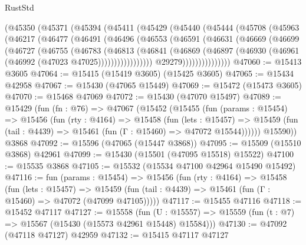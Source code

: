 \begin{lexlean}{RustStd}
\begin{coremodule}
{\begin{coremodule}
{{{{{{{{{{{{{{{{{{{{{{{{{{{{{{{{{{{{{{{{{{{{{{{{{{{{{{{{{{{{          (@45350
            (@45371
              (@45394
                (@45411
                  (@45429
                    (@45440
                      (@45444
                        (@45708
                          (@45963
                            (@46217
                              (@46477
                                (@46491
                                  (@46496
                                    (@46553
                                      (@46591
                                        (@46631
                                          (@46669
                                            (@46699
                                              (@46727
                                                (@46755
                                                  (@46783
                                                    (@46813
                                                      (@46841
                                                        (@46869
                                                          (@46897
                                                            (@46930
                                                              (@46961
                                                                (@46992
                                                                  (@47023 @47025)))))))))))))))))
                                  @29279)))))))))))))))
@47060 := @15413 @3605
@47064 := @15415 (@15419 @3605) (@15425 @3605)
@47065 := @15434 @42958
@47067 := @15430 (@47065 @15449)
@47069 := @15472 (@15473 @3605)
@47070 := @15468 @47069
@47072 := @15430 (@47070 @15497)
@47089 := @15429
    (fun (fn : @76) =>
    @47067
      (@15452
        (@15455
          (fun (params : @15454) =>
          @15456
            (fun (rty : @4164) =>
            @15458
              (fun (lets : @15457) =>
              @15459 (fun (tail : @4439) => @15461 (fun (Γ : @15460) => @47072 @15544))))))
        @15590))
    @3868
@47092 := @15596 (@47065 (@15447 @3868))
@47095 := @15509 (@15510 @3868) @42961
@47099 := @15430 (@15501 (@47095 @15518) @15522)
@47100 := @15535 @3868
@47105 := @15532 (@15534 @47100 @42964 @15490 @15492)
@47116 := fun (params : @15454) =>
  @15456
    (fun (rty : @4164) =>
    @15458
      (fun (lets : @15457) =>
      @15459 (fun (tail : @4439) => @15461 (fun (Γ : @15460) => @47072 (@47099 @47105)))))
@47117 := @15455 @47116
@47118 := @15452 @47117
@47127 := @15558
    (fun (U : @15557) => @15559 (fun (t : @7) => @15567 (@15430 (@15573 @42961 @15448) @15584)))
@47130 := @47092 (@47118 @47127) @42959
@47132 := @15415 @47117 @47127
}}}}}}}}}}}}}}}}}}}}}}}}}}}}}}}}}}}}}}}}}}}}}}}}}}}}}}}}}}}}
\end{coremodule}}
\end{coremodule}
\end{lexlean}
